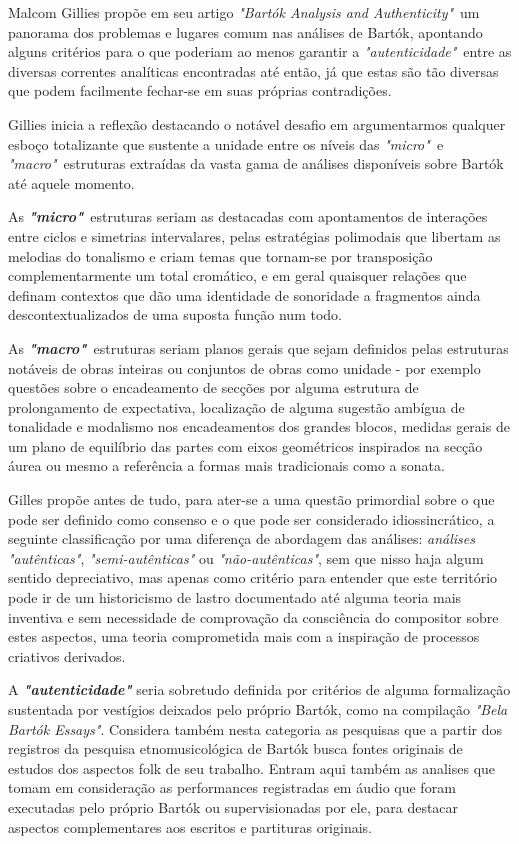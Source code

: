\documentclass[
	12pt,				%
	openright,			%
	twoside,			%
	a4paper,			%
	english,			%
	french,				%
	spanish,			%
	brazil				%
	]{abntex2}
\begin{document}
Malcom Gillies propõe em seu artigo \textit{"Bartók Analysis and Authenticity"}\cite{gillies1995bartok}\ um panorama dos problemas e lugares comum nas análises de Bartók, apontando alguns critérios para o que poderiam ao menos garantir a \textit{"autenticidade"}\ entre as diversas correntes analíticas encontradas até então, já que estas são tão diversas que podem facilmente fechar-se em suas próprias contradições. 

Gillies inicia a reflexão destacando o notável desafio em argumentarmos qualquer esboço totalizante que sustente a unidade entre os níveis das \textit{ "micro"}\ e \textit{"macro"}\ estruturas extraídas da vasta gama de análises disponíveis sobre Bartók até aquele momento.

As \textit{ \textbf{"micro"}}\ estruturas seriam as destacadas com apontamentos de interações entre ciclos e simetrias intervalares, pelas estratégias polimodais que libertam as melodias do tonalismo e criam temas que tornam-se por transposição complementarmente um total cromático, e em geral quaisquer relações que definam contextos que dão uma identidade de sonoridade a fragmentos ainda descontextualizados de uma suposta função num todo. 

As \textit{\textbf{"macro"}}\ estruturas seriam planos gerais que sejam definidos pelas estruturas notáveis de obras inteiras ou conjuntos de obras como unidade - por exemplo questões sobre o encadeamento de secções por alguma estrutura de prolongamento de expectativa, localização de alguma sugestão ambígua de tonalidade e modalismo nos encadeamentos dos grandes blocos, medidas gerais de um plano de equilíbrio das partes com eixos geométricos inspirados na secção áurea ou mesmo a referência a formas mais tradicionais como a sonata.

Gilles propõe antes de tudo, para ater-se a uma questão primordial sobre o que pode ser definido como consenso e o que pode ser considerado idiossincrático, a seguinte classificação por uma diferença de abordagem das análises: \textit{análises "autênticas"}, \textit{"semi-autênticas"} ou \textit{"não-autênticas"}, sem que nisso haja algum sentido depreciativo, mas apenas como critério para entender que este território pode ir de um historicismo de lastro documentado até alguma teoria mais inventiva e sem necessidade de comprovação da consciência do compositor sobre estes aspectos, uma teoria comprometida mais com a inspiração de processos criativos derivados.

A \textit{\textbf{"autenticidade"}} seria sobretudo definida por critérios de alguma formalização sustentada por vestígios deixados pelo próprio Bartók, como na compilação \textit{"Bela Bartók Essays"}\cite{bartok1993bela}. Considera também nesta categoria as pesquisas que a partir dos registros da pesquisa etnomusicológica de Bartók busca fontes originais de estudos dos aspectos folk de seu trabalho. Entram aqui também as analises que tomam em consideração as performances registradas em áudio que foram executadas pelo próprio Bartók ou supervisionadas por ele, para destacar aspectos complementares aos escritos e partituras originais. 
\end{document}
